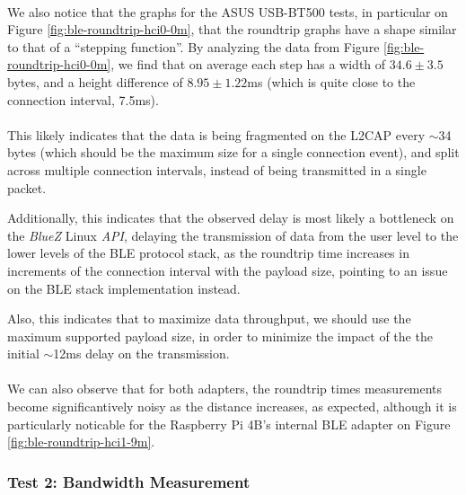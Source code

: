 \paragraph{} We also notice that the graphs for the ASUS USB-BT500 tests, in particular on Figure \ref{fig:ble-roundtrip-hci0-0m}, that the roundtrip graphs have a shape similar to that of a ``stepping function''. By analyzing the data from Figure \ref{fig:ble-roundtrip-hci0-0m}, we find that on average each step has a width of $34.6 \pm 3.5$ bytes, and a height difference of $8.95 \pm 1.22$ms (which is quite close to the connection interval, 7.5ms).

\paragraph{} This likely indicates that the data is being fragmented on the \acs{L2CAP} every $\sim$34 bytes (which should be the maximum size for a single connection event), and split across multiple connection intervals, instead of being transmitted in a single packet. 

Additionally, this indicates that the observed delay is most likely a bottleneck on the \textit{BlueZ} Linux \textit{API}, delaying the transmission of data from the user level to the lower levels of the \acs{BLE} protocol stack, as the roundtrip time increases in increments of the connection interval with the payload size, pointing to an issue on the \acs{BLE} stack implementation instead.

Also, this indicates that to maximize data throughput, we should use the maximum supported payload size, in order to minimize the impact of the the initial $\sim$12ms delay on the transmission.
 
\paragraph{} We can also observe that for both adapters, the roundtrip times measurements become significantively noisy as the distance increases, as expected, although it is particularly noticable for the Raspberry Pi 4B's internal \acs{BLE} adapter on Figure \ref{fig:ble-roundtrip-hci1-9m}. 

\paragraph{} 

\subsubsection{Test 2: Bandwidth Measurement}

